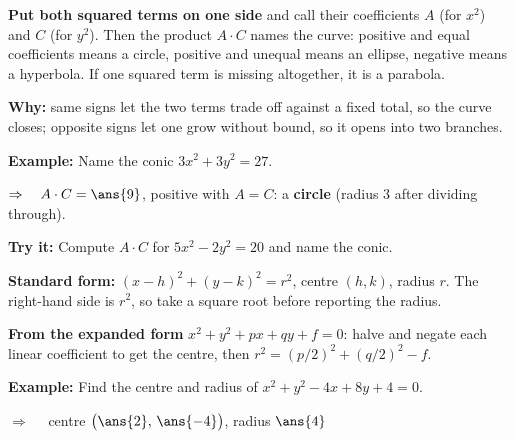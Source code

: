 \documentclass[12pt]{article}
\begin{document}


\begin{formulabox}
\textbf{Put both squared terms on one side} and call their coefficients $A$ (for $x^2$) and
$C$ (for $y^2$). Then the product $A \cdot C$ names the curve: positive and equal
coefficients means a circle, positive and unequal means an ellipse, negative means a
hyperbola. If one squared term is missing altogether, it is a parabola.\par
\textbf{Why:} same signs let the two terms trade off against a fixed total, so the curve
closes; opposite signs let one grow without bound, so it opens into two branches.
\end{formulabox}

\begin{examplebox}
\textbf{Example:} \quad Name the conic $3x^2 + 3y^2 = 27$.

$\Rightarrow\quad A \cdot C = \ans{9}$, positive with $A = C$: a \textbf{circle} (radius $3$ after dividing through).
\end{examplebox}

\begin{tryitbox}
\textbf{Try it:} \quad Compute $A \cdot C$ for $5x^2 - 2y^2 = 20$ and name the conic.\\[2pt]
\end{tryitbox}


\begin{formulabox}
\textbf{Standard form:} $(x-h)^2 + (y-k)^2 = r^2$, centre $(h, k)$, radius $r$. The
right-hand side is $r^2$, so take a square root before reporting the radius.\par
\textbf{From the expanded form} $x^2 + y^2 + px + qy + f = 0$: halve and negate each linear
coefficient to get the centre, then $r^2 = (p/2)^2 + (q/2)^2 - f$.
\end{formulabox}

\begin{examplebox}
\textbf{Example:} \quad Find the centre and radius of $x^2 + y^2 - 4x + 8y + 4 = 0$.

$\Rightarrow\quad$ centre $\bigl(\ans{2},\, \ans{-4}\bigr)$, \quad radius $\ans{4}$
\end{examplebox}
\end{document}
